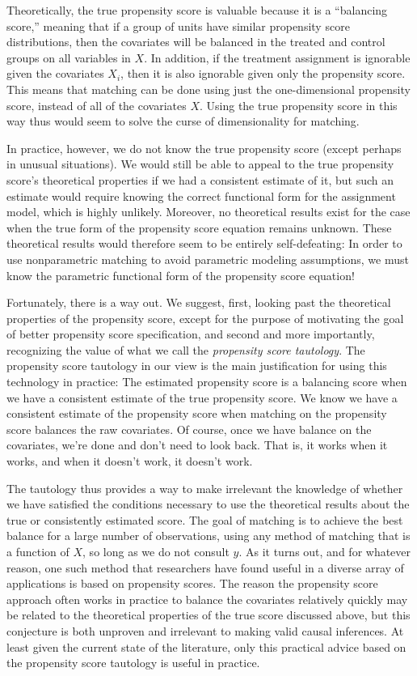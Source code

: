 \documentclass[11pt,titlepage]{article}
\begin{document}
Theoretically, the true propensity score is valuable because it is a
``balancing score,'' meaning that if a group of units have similar
propensity score distributions, then the covariates will be balanced
in the treated and control groups on all variables in $X$.  In
addition, if the treatment assignment is ignorable given the
covariates $X_i$, then it is also ignorable given only the propensity
score.  This means that matching can be done using just the
one-dimensional propensity score, instead of all of the covariates
$X$.  Using the true propensity score in this way thus would seem to
solve the curse of dimensionality for matching.

In practice, however, we do not know the true propensity score (except
perhaps in unusual situations).  We would still be able to appeal to
the true propensity score's theoretical properties if we had a
consistent estimate of it, but such an estimate would require knowing
the correct functional form for the assignment model, which is highly
unlikely.  Moreover, no theoretical results exist for the case when
the true form of the propensity score equation remains unknown.  These
theoretical results would therefore seem to be entirely
self-defeating: In order to use nonparametric matching to avoid
parametric modeling assumptions, we must know the parametric
functional form of the propensity score equation!

Fortunately, there is a way out.  We suggest, first, looking past the
theoretical properties of the propensity score, except for the purpose
of motivating the goal of better propensity score specification, and
second and more importantly, recognizing the value of what we call the
\emph{propensity score tautology}.  The propensity score tautology in
our view is the main justification for using this technology in
practice: The estimated propensity score is a balancing score when we
have a consistent estimate of the true propensity score.  We know we
have a consistent estimate of the propensity score when matching on
the propensity score balances the raw covariates.  Of course, once we
have balance on the covariates, we're done and don't need to look
back.  That is, it works when it works, and when it doesn't work, it
doesn't work.

The tautology thus provides a way to make irrelevant the knowledge of
whether we have satisfied the conditions necessary to use the
theoretical results about the true or consistently estimated score.
The goal of matching is to achieve the best balance for a large number
of observations, using any method of matching that is a function of
$X$, so long as we do not consult $y$.  As it turns out, and for
whatever reason, one such method that researchers have found useful in
a diverse array of applications is based on propensity scores.  The
reason the propensity score approach often works in practice to
balance the covariates relatively quickly may be related to the
theoretical properties of the true score discussed above, but this
conjecture is both unproven and irrelevant to making valid causal
inferences.  At least given the current state of the literature, only
this practical advice based on the propensity score tautology is
useful in practice.
\end{document}
